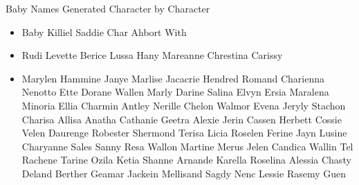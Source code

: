 \documentclass{beamer}
\begin{document}
  {
    \begin{frame}{Baby Names Generated Character by Character}
      \begin{itemize}[<+- | alert@+>]
        \item Baby Killiel Saddie Char Ahbort With
        \item Rudi Levette Berice Lussa Hany Mareanne Chrestina Carissy
        \item Marylen Hammine Janye Marlise Jacacrie Hendred Romand Charienna Nenotto Ette Dorane Wallen Marly Darine Salina Elvyn Ersia Maralena Minoria Ellia Charmin Antley Nerille Chelon Walmor Evena Jeryly Stachon Charisa Allisa Anatha Cathanie Geetra Alexie Jerin Cassen Herbett Cossie Velen Daurenge Robester Shermond Terisa Licia Roselen Ferine Jayn Lusine Charyanne Sales Sanny Resa Wallon Martine Merus Jelen Candica Wallin Tel Rachene Tarine Ozila Ketia Shanne Arnande Karella Roselina Alessia Chasty Deland Berther Geamar Jackein Mellisand Sagdy Nenc Lessie Rasemy Guen
      \end{itemize}
    \end{frame}


}
\end{document}
